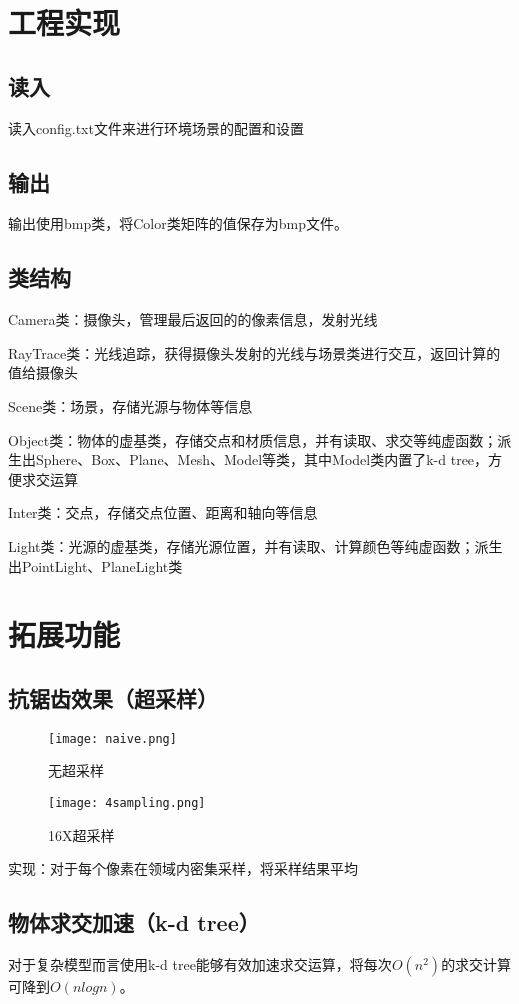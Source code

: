 \documentclass[12pt, a4paper, UTF8]{article}
\begin{document}
\section{工程实现}
\subsection{读入}
读入config.txt文件来进行环境场景的配置和设置
\subsection{输出}
输出使用bmp类，将Color类矩阵的值保存为bmp文件。
\subsection{类结构}

Camera类：摄像头，管理最后返回的的像素信息，发射光线\par
RayTrace类：光线追踪，获得摄像头发射的光线与场景类进行交互，返回计算的值给摄像头\par
Scene类：场景，存储光源与物体等信息\par
Object类：物体的虚基类，存储交点和材质信息，并有读取、求交等纯虚函数；派生出Sphere、Box、Plane、Mesh、Model等类，其中Model类内置了k-d tree，方便求交运算\par
Inter类：交点，存储交点位置、距离和轴向等信息\par
Light类：光源的虚基类，存储光源位置，并有读取、计算颜色等纯虚函数；派生出PointLight、PlaneLight类\par

\section{拓展功能}
\subsection{抗锯齿效果（超采样）}
	\begin{figure}[h]
		\centering
		\texttt{[image: naive.png]}
			\caption{无超采样}	
	\end{figure}
	\begin{figure}[h]
		\centering
		\texttt{[image: 4sampling.png]}
			\caption{16X超采样}	
	\end{figure}
实现：对于每个像素在领域内密集采样，将采样结果平均
\subsection{物体求交加速（k-d tree）}
对于复杂模型而言使用k-d tree能够有效加速求交运算，将每次$O(n^2)$的求交计算可降到$O(nlogn)$。
\end{document}

